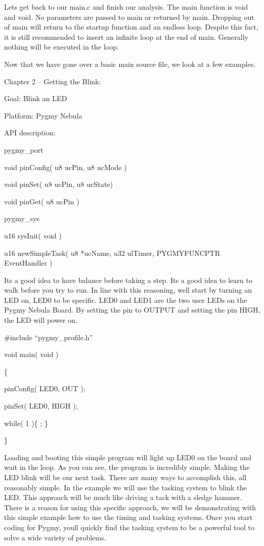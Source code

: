 \documentclass{article}
\begin{document}
Let{\textquotesingle}s get back to our {\textquotesingle}main.c{\textquotesingle} and finish our analysis. The main function is void and void. No parameters are passed to main or returned by main. Dropping out of main will return to the startup function and an endless loop. Despite this fact, it is still recommended to insert an infinite loop at the end of main. Generally nothing will be executed in the loop.

Now that we have gone over a basic main source file, we look at a few examples.


\bigskip

Chapter 2 -- Getting the Blink:


\bigskip

Goal: Blink an LED

Platform: Pygmy Nebula

API description:

pygmy\_port

void pinConfig( u8 ucPin, u8 ucMode )

void pinSet( u8 ucPin, u8 ucState)

void pinGet( u8 ucPin )

pygmy\_sys

u16 sysInit( void )

u16 newSimpleTask( u8 *ucName, u32 ulTimer, PYGMYFUNCPTR EventHandler )


\bigskip

It{\textquotesingle}s a good idea to have balance before taking a step. It{\textquotesingle}s a good idea to learn to walk before you try to run. In line with this reasoning, we{\textquotesingle}ll start by turning an LED on, LED0 to be specific. LED0 and LED1 are the two user LEDs on the Pygmy Nebula Board. By setting the pin to OUTPUT and setting the pin HIGH, the LED will power on.


\bigskip

\#include {\textquotedblleft}pygmy\_profile.h{\textquotedblright}


\bigskip

void main( void )

\{

pinConfig( LED0, OUT );

pinSet( LED0, HIGH );


\bigskip

while( 1 )\{ ; \}

\}


\bigskip

Loading and booting this simple program will light up LED0 on the board and wait in the loop. As you can see, the program is incredibly simple. Making the LED blink will be our next task. There are many ways to accomplish this, all reasonably simple. In the example we will use the tasking system to blink the LED. This approach will be much like driving a tack with a sledge hammer. There is a reason for using this specific approach, we will be demonstrating with this simple example how to use the timing and tasking systems. Once you start coding for Pygmy, you{\textquotesingle}ll quickly find the tasking system to be a powerful tool to solve a wide variety of problems.
\end{document}
